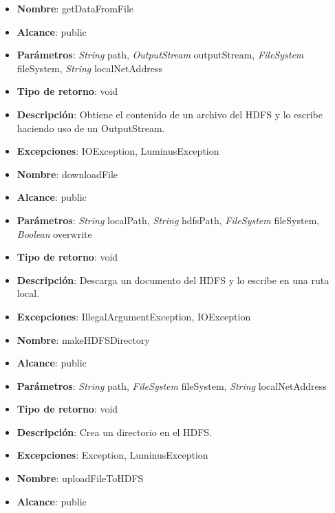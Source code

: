 \begin{UClist}
	\begin{itemize}
		\item \textbf{Nombre}: getDataFromFile
		\item \textbf{Alcance}: public
		\item \textbf{Parámetros}: \emph{String} path, \emph{OutputStream} outputStream, \emph{FileSystem} fileSystem, \emph{String} localNetAddress
		\item \textbf{Tipo de retorno}: void
		\item \textbf{Descripción}: Obtiene el contenido de un archivo del HDFS y lo escribe haciendo uso de un OutputStream.
		\item \textbf{Excepciones}: IOException, LuminusException\\
	\end{itemize}
	\begin{itemize}
		\item \textbf{Nombre}: downloadFile
		\item \textbf{Alcance}: public
		\item \textbf{Parámetros}: \emph{String} localPath, \emph{String} hdfsPath, \emph{FileSystem} fileSystem, \emph{Boolean} overwrite
		\item \textbf{Tipo de retorno}: void
		\item \textbf{Descripción}: Descarga un documento del HDFS y lo escribe en una ruta local.
		\item \textbf{Excepciones}: IllegalArgumentException, IOException\\
	\end{itemize}
	\begin{itemize}
		\item \textbf{Nombre}: makeHDFSDirectory
		\item \textbf{Alcance}: public
		\item \textbf{Parámetros}: \emph{String} path, \emph{FileSystem} fileSystem, \emph{String} localNetAddress
		\item \textbf{Tipo de retorno}: void
		\item \textbf{Descripción}: Crea un directorio en el HDFS.
		\item \textbf{Excepciones}: Exception, LuminusException\\
	\end{itemize}
	\begin{itemize}
		\item \textbf{Nombre}: uploadFileToHDFS
		\item \textbf{Alcance}: public

\end{itemize}
\end{UClist}
